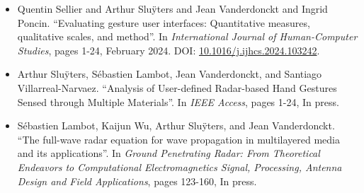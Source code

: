 {\begin{itemize}
    \item Quentin Sellier and Arthur Slu\"{y}ters and Jean Vanderdonckt and Ingrid Poncin. ``Evaluating gesture user interfaces: Quantitative measures, qualitative scales, and method''. In \textit{International Journal of Human-Computer Studies}, pages 1-24, February 2024. DOI: \href{https://doi.org/10.1016/j.ijhcs.2024.103242}{10.1016/j.ijhcs.2024.103242}. 

    \item Arthur Slu\"{y}ters, S\'{e}bastien Lambot, Jean Vanderdonckt, and Santiago Villarreal-Narvaez. ``Analysis of User-defined Radar-based Hand Gestures Sensed through Multiple Materials''. In \textit{IEEE Access}, pages 1-24, In press.
    
    \item S\'{e}bastien Lambot, Kaijun Wu, Arthur Slu\"{y}ters, and Jean Vanderdonckt. ``The full-wave radar equation for wave propagation in multilayered media and its applications''. In \textit{Ground Penetrating Radar: From Theoretical Endeavors to Computational Electromagnetics Signal, Processing, Antenna Design and Field Applications}, pages 123-160, In press.
    
\end{itemize}
}